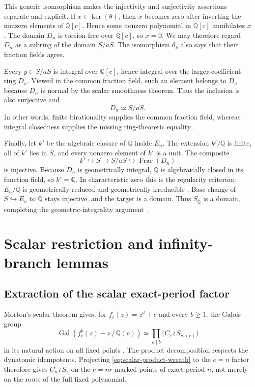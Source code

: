 \documentclass[11pt]{article}
\theoremstyle{definition}
\theoremstyle{remark}
\newcommand{\Q}{\mathbb{Q}}
\newcommand{\Qbar}{\overline{\mathbb{Q}}}
\newcommand{\Frac}{\operatorname{Frac}}
\newcommand{\Gal}{\operatorname{Gal}}
\newcommand{\wrp}{\mathbin{\wr}}
\begin{document}
This generic isomorphism makes the injectivity and surjectivity assertions
separate and explicit.  If $x\in\ker(\theta)$, then $x$ becomes zero after
inverting the nonzero elements of $\Q[c]$.  Hence some nonzero polynomial in
$\Q[c]$ annihilates $x$.  The domain $D_n$ is torsion-free over $\Q[c]$, so
$x=0$.  We may therefore regard $D_n$ as a subring of the domain $S/aS$.
The isomorphism $\theta_k$ also says that their fraction fields agree.

Every $y\in S/aS$ is integral over $\Q[c]$, hence integral over the larger
coefficient ring $D_n$.  Viewed in the common fraction field, such an
element belongs to $D_n$ because $D_n$ is normal by the scalar smoothness
theorem.  Thus the inclusion is also surjective and
\[
 D_n\simeq S/aS.
\]
In other words, finite birationality supplies the common fraction field,
whereas integral closedness supplies the missing ring-theoretic equality
\citep{stacks-0309}.

Finally, let $k'$ be the algebraic closure of $\Q$ inside $E_n$.  The
extension $k'/\Q$ is finite, all of $k'$ lies in $S$, and every nonzero
element of $k'$ is a unit.  The composite
\[
 k'\hookrightarrow S\longrightarrow S/aS\hookrightarrow\Frac(D_n)
\]
is injective.  Because $D_n$ is geometrically integral, $\Q$ is
algebraically closed in its function field, so $k'=\Q$.  In characteristic
zero this is the regularity criterion: $E_n/\Q$ is geometrically reduced and
geometrically irreducible \citep{stacks-0322,stacks-037p}.  Base change of
$S\hookrightarrow E_n$ to $\Qbar$ stays injective, and the target is a
domain.  Thus $S_{\Qbar}$ is a domain, completing the geometric-integrality
argument \citep{stacks-0fwf}.

\section{Scalar restriction and infinity-branch lemmas}
\label{app:branches}

\subsection{Extraction of the scalar exact-period factor}

Morton's scalar theorem gives, for $f_c(z)=z^d+c$ and every $b\geq1$, the
Galois group
\begin{equation}\label{eq:scalar-product-wreath}
 \Gal(f_c^b(z)-z\,/\,\Q(c))
 \simeq \prod_{e\mid b}\bigl(C_e\wrp S_{r_d(e)}\bigr)
\end{equation}
in its natural action on all fixed points
\citep{morton-1998-periodic-galois}.  The product decomposition respects the
dynatomic idempotents.  Projecting \eqref{eq:scalar-product-wreath} to the
$e=n$ factor therefore gives $C_n\wrp S_r$ on the $\nu=nr$ marked points of
exact period $n$, not merely on the roots of the full fixed polynomial.
\end{document}
